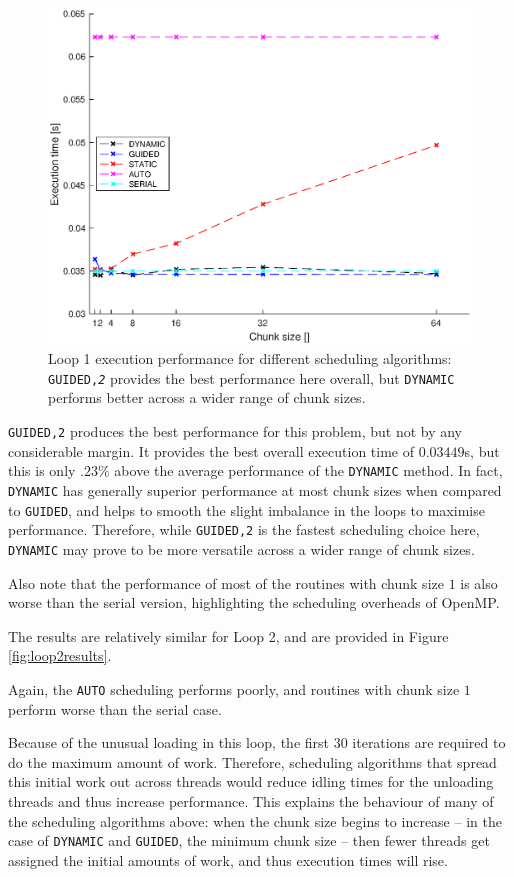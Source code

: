 \documentclass{article} %
\newcommand{\tp}{\texttt}
\begin{document}
\begin{figure}
    \centering
    \includegraphics[height=.35\textheight]{part1_plots/all_part1.eps}
    \caption{Loop 1 execution performance for different scheduling algorithms: \tp{GUIDED,\textit{2}} provides the best performance here overall, but \tp{DYNAMIC} performs better across a wider range of chunk sizes.}
    \label{fig:loop1results}
\end{figure} 

\tp{GUIDED,2} produces the best performance for this problem, but not by any considerable margin.
It provides the best overall execution time of $0.03449$s, but this is only $.23\%$ above the average performance of the \tp{DYNAMIC} method. 
In fact, \tp{DYNAMIC} has generally superior performance at most chunk sizes when compared to \tp{GUIDED}, and helps to smooth the slight imbalance in the loops to maximise performance.
Therefore, while \tp{GUIDED,2} is the fastest scheduling choice here, \tp{DYNAMIC} may prove to be more versatile across a wider range of chunk sizes.

Also note that the performance of most of the routines with chunk size $1$ is also worse than the serial version, highlighting the scheduling overheads of OpenMP.

The results are relatively similar for Loop 2, and are provided in Figure \ref{fig:loop2results}. 

Again, the \tp{AUTO} scheduling performs poorly, and routines with chunk size $1$ perform worse than the serial case.

Because of the unusual loading in this loop, the first 30 iterations are required to do the maximum amount of work.
Therefore, scheduling algorithms that spread this initial work out across threads would reduce idling times for the unloading threads and thus increase performance.
This explains the behaviour of many of the scheduling algorithms above: when the chunk size begins to increase -- in the case of \tp{DYNAMIC} and \tp{GUIDED}, the minimum chunk size -- then fewer threads get assigned the initial amounts of work, and thus execution times will rise.
\end{document}

